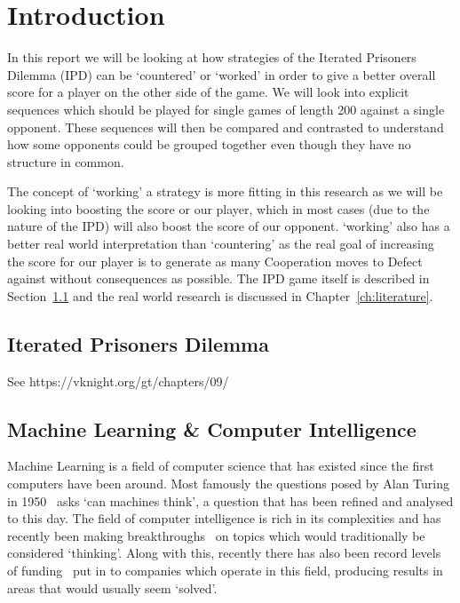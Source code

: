 
\chapter{Introduction}\label{ch:intro}
In this report we will be looking at how strategies of the Iterated Prisoners Dilemma (IPD) can be `countered' or `worked' in order to give a better overall score for a player on the other side of the game.
We will look into explicit sequences which should be played for single games of length 200 against a single opponent.
These sequences will then be compared and contrasted to understand how some opponents could be grouped together even though they have no structure in common.

The concept of `working' a strategy is more fitting in this research as we will be looking into boosting the score or our player, which in most cases (due to the nature of the IPD) will also boost the score of our opponent.
`working' also has a better real world interpretation than `countering' as the real goal of increasing the score for our player is to generate as many Cooperation moves to Defect against without consequences as possible.
The IPD game itself is described in Section~\ref{sec:iteratedPrisonersDilemma} and the real world research is discussed in Chapter~\ref{ch:literature}.

\section{Iterated Prisoners Dilemma}\label{sec:iteratedPrisonersDilemma}

See https://vknight.org/gt/chapters/09/

\section{Machine Learning \& Computer Intelligence}\label{sec:machineLearningAndcomputerIntelligence}
Machine Learning is a field of computer science that has existed since the first computers have been around.
Most famously the questions posed by Alan Turing in 1950~\cite{turing1950computing} asks `can machines think', a question that has been refined and analysed to this day.
The field of computer intelligence is rich in its complexities and has recently been making breakthroughs~\cite{knight2017alphaZeroMIT} on topics which would traditionally be considered `thinking'.
Along with this, recently there has also been record levels of funding~\cite{chui2017artificial} put in to companies which operate in this field, producing results in areas that would usually seem `solved'.

